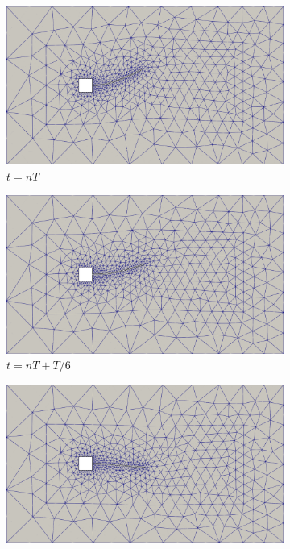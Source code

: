 \begin{figure}[h!]
    \centering
    \caption{\textit{Flutter} em painel - Caso 2 - Configurações da malha obtidas no problema.}
    \begin{subfigure}[b]{0.49\textwidth}
        \includegraphics[width=\linewidth]{Figuras/FSI-prism2/mT1.png}
        \caption{$t=nT$}
    \end{subfigure}
    \begin{subfigure}[b]{0.49\textwidth}
        \includegraphics[width=\linewidth]{Figuras/FSI-prism2/mT2.png}
        \caption{$t=nT+T/6$}
    \end{subfigure}
    \begin{subfigure}[b]{0.49\textwidth}
        \includegraphics[width=\linewidth]{Figuras/FSI-prism2/mT3.png}

\end{subfigure}
\end{figure}
